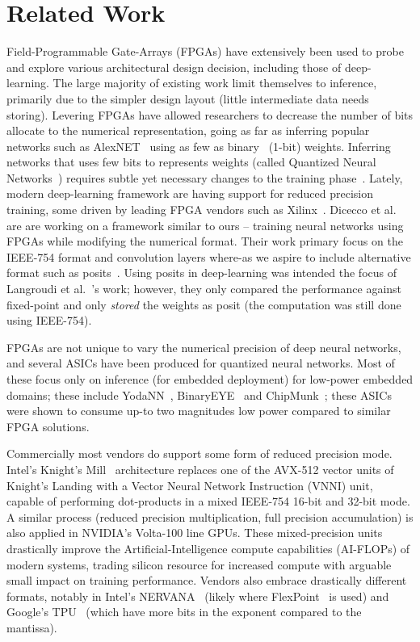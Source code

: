 \documentclass[techrep,english]{ipsj} %
\begin{document}
\section{Related Work}\label{sec:relwork}
Field-Programmable Gate-Arrays (FPGAs) have extensively been used to probe and explore various architectural design decision, including those of deep-learning.
The large majority of existing work limit themselves to inference, primarily due to the simpler design layout (little intermediate data needs storing).
Levering FPGAs have allowed researchers to decrease the number of bits allocate to the numerical representation, going as far as inferring popular networks such as  AlexNET~\cite{krizhevsky2012imagenet} using as few as binary~\cite{shimoda2017all,umuroglu2017finn} (1-bit) weights.
Inferring networks that uses few bits to represents weights (called Quantized Neural Networks~\cite{courbariaux2016binarized}) requires subtle yet necessary changes to the training phase~\cite{binaryconnect,courbariaux2016binarized,zhou2016dorefa}.
Lately, modern deep-learning framework are having support for reduced precision training, some driven by leading FPGA vendors such as Xilinx~\cite{xilinxml}.
Dicecco et al.~\cite{dicecco2017fpga} are are working on a framework similar to ours – training neural networks using FPGAs while modifying the numerical format.
Their work primary focus on the IEEE-754 format and convolution layers where-as we aspire to include alternative format such as posits~\cite{posits}.
Using posits in deep-learning was intended the focus of Langroudi et al.~\cite{langroudi2018deep}’s work; however, they only compared the performance against fixed-point and only \textit{stored} the weights as posit (the computation was still done using IEEE-754).

FPGAs are not unique to vary the numerical precision of deep neural networks, and several ASICs have been produced for quantized neural networks.
Most of these focus only on inference (for embedded deployment)  for low-power embedded domains; these include YodaNN~\cite{yodann}, BinaryEYE~\cite{binaryeye} and ChipMunk~\cite{chipmunk}; these ASICs were shown to consume up-to two magnitudes low power compared to similar FPGA solutions.

Commercially most vendors do support some form of reduced precision mode.
Intel’s Knight’s Mill~\cite{knm} architecture replaces one of the AVX-512 vector units of Knight’s Landing with a Vector Neural Network Instruction (VNNI) unit, capable of performing dot-products in a mixed IEEE-754 16-bit and 32-bit mode.
A similar process (reduced precision multiplication, full precision accumulation) is also applied in NVIDIA’s Volta-100 line GPUs.
These mixed-precision units drastically improve the Artificial-Intelligence compute capabilities (AI-FLOPs) of modern systems, trading silicon resource for increased compute with arguable small impact on training performance.
Vendors also embrace drastically different formats, notably in Intel’s NERVANA~\cite{nervana} (likely where FlexPoint~\cite{intelflexpoint} is used) and Google’s TPU~\cite{tpuformat} (which have more bits in the exponent compared to the mantissa).
\end{document}
